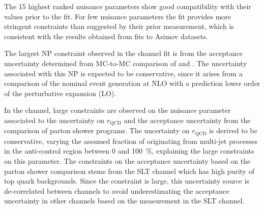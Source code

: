 The 15 highest ranked nuisance parameters show good compatibility with
their values prior to the fit. For few nuisance parameters the fit
provides more stringent constraints than suggested by their prior
measurement, which is consistent with the results obtained from fits
to Asimov datasets.

The largest NP constraint observed in the \hadhad channel fit is from
the \ZHF acceptance uncertainty determined from MC-to-MC comparison of
\SHERPA and \MGNLOPY. The uncertainty associated with this NP is
expected to be conservative, since it arises from a comparison of the
nominal event generation at NLO with a prediction lower order of the
perturbative expansion (LO).

In the \lephad channel, large constraints are observed on the nuisance
parameter associated to the uncertainty on $r_{\text{QCD}}$ and the
\ttbar acceptance uncertainty from the comparison of parton shower
programs. The uncertainty on $r_{\text{QCD}}$ is derived to be
conservative, varying the assumed fraction of \faketauhadvis
originating from multi-jet processes in the anti-\tauhadvis control
region between 0 and \SI{100}{\percent}, explaining the large
constraints on this parameter. The constraints on the \ttbar
acceptance uncertainty based on the parton shower comparison stems
from the \lephad SLT channel which has high purity of top quark
backgrounds. Since the constraint is large, this uncertainty source is
de-correlated between channels to avoid underestimating the acceptance
uncertainty in other channels based on the measurement in the \lephad
SLT channel.

